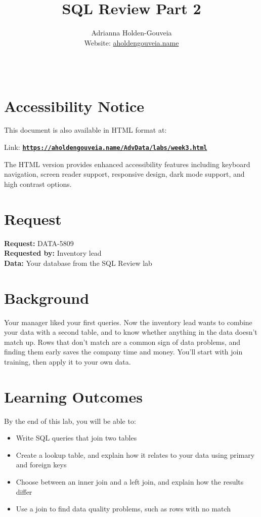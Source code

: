\documentclass[12pt]{article}
\title{SQL Review Part 2}
\author{
        Adrianna Holden-Gouveia \\
        Website: \href{https://aholdengouveia.name}{aholdengouveia.name}\\ 
        \date{\vspace{-5ex}}
        \faGithub {: aholdengouveia} \\
        }
\begin{document}
    

\maketitle



\section*{Accessibility Notice}
This document is also available in HTML format at:

Link: \href{https://aholdengouveia.name/AdvData/labs/week3.html}{\textbf{\nolinkurl{https://aholdengouveia.name/AdvData/labs/week3.html}}}

The HTML version provides enhanced accessibility features including keyboard navigation, screen reader support, responsive design, dark mode support, and high contrast options.

\section*{Request}
\noindent\textbf{Request:} DATA-5809\\
\textbf{Requested by:} Inventory lead\\
\textbf{Data:} Your database from the SQL Review lab

\section*{Background}
Your manager liked your first queries. Now the inventory lead wants to combine your data with a second table, and to know whether anything in the data doesn't match up. Rows that don't match are a common sign of data problems, and finding them early saves the company time and money. You'll start with join training, then apply it to your own data.

\section*{Learning Outcomes}
By the end of this lab, you will be able to:
\begin{itemize}
    \item Write SQL queries that join two tables
    \item Create a lookup table, and explain how it relates to your data using primary and foreign keys
    \item Choose between an inner join and a left join, and explain how the results differ
    \item Use a join to find data quality problems, such as rows with no match
\end{itemize}
\end{document}
